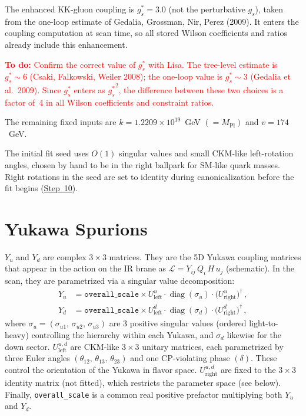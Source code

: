 \documentclass[11pt]{article}
\newcommand{\Mpl}{M_{\mathrm{Pl}}}
\newcommand{\gs}{g_s^*}
\begin{document}
The enhanced KK-gluon coupling is $\gs = 3.0$ (not the perturbative $g_s$),
taken from the one-loop estimate of Gedalia, Grossman, Nir, Perez (2009). It
enters the coupling computation at scan time, so all stored Wilson coefficients
and ratios already include this enhancement.

\textcolor{red}{\textbf{To do:} Confirm the correct value of $\gs$ with
Lisa.  The tree-level estimate is $\gs \sim 6$ (Csaki, Falkowski, Weiler
2008); the one-loop value is $\gs \sim 3$ (Gedalia et al.\ 2009).  Since
$\gs$ enters as ${\gs}^2$, the difference between these two choices is a
factor of~4 in all Wilson coefficients and constraint ratios.}

The remaining fixed inputs are $k = 1.2209\times10^{19}$~GeV $(= \Mpl)$ and
$v = 174$~GeV.

The initial fit seed uses $O(1)$ singular values and small CKM-like
left-rotation angles, chosen by hand to be in the right ballpark for SM-like
quark masses.  Right rotations in the seed are set to identity during
canonicalization before the fit begins
(\hyperref[sec:step10]{Step~10}).

\section{Yukawa Spurions}
\label{sec:step3}

$Y_u$ and $Y_d$ are complex $3\times3$ matrices.  They are the 5D Yukawa
coupling matrices that appear in the action on the IR brane as
$\mathcal{L} = Y_{ij}\,Q_i\,H\,u_j$ (schematic).
In the scan, they are parametrized via a singular value decomposition:
\begin{align}
  Y_u &= \texttt{overall\_scale} \times U_{\mathrm{left}}^u
    \cdot \operatorname{diag}(\sigma_u)
    \cdot \bigl(U_{\mathrm{right}}^u\bigr)^\dagger\,, \\
  Y_d &= \texttt{overall\_scale} \times U_{\mathrm{left}}^d
    \cdot \operatorname{diag}(\sigma_d)
    \cdot \bigl(U_{\mathrm{right}}^d\bigr)^\dagger\,,
\end{align}
where $\sigma_u = (\sigma_{u1},\,\sigma_{u2},\,\sigma_{u3})$ are 3 positive
singular values (ordered light-to-heavy) controlling the hierarchy within each
Yukawa, and $\sigma_d$ likewise for the down sector.
$U_{\mathrm{left}}^{u,d}$ are CKM-like $3\times3$ unitary matrices, each
parametrized by three Euler angles
$(\theta_{12},\,\theta_{13},\,\theta_{23})$ and one CP-violating phase
$(\delta)$. These control the orientation of the Yukawa in flavor space.
$U_{\mathrm{right}}^{u,d}$ are fixed to the $3\times3$ identity matrix
(not fitted), which restricts the parameter space (see below).
Finally, \texttt{overall\_scale} is a common real positive prefactor multiplying
both $Y_u$ and $Y_d$.
\end{document}
